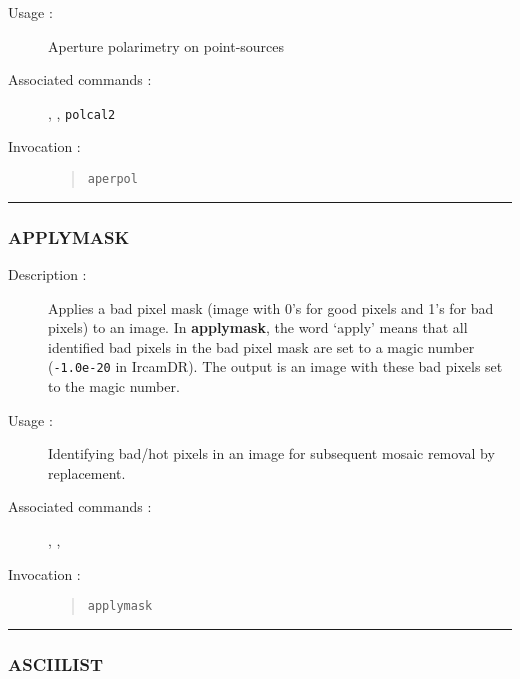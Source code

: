 \begin{description}
\item[Usage :] Aperture polarimetry on point-sources

\item[Associated commands :] {\tt {}},
{\tt {}}, {\tt {}}
{\tt polcal2}

\item[Invocation :]

\begin{quote}{\tt  aperpol }\end{quote}

\end{description}

\hrule
\subsubsection*{\label{APPLYMASK}APPLYMASK}

\begin{description}

\item[Description :] Applies a bad pixel mask (image with 0's for good
pixels and 1's for bad pixels) to an image.  In {\bf applymask}, the word
`apply' means that all identified bad pixels in the bad pixel mask are
set to a magic number ({\tt -1.0e-20} in {\sc IrcamDR}).  The output is
an image with these bad pixels set to the magic number.

\item[Usage :] Identifying bad/hot pixels in an image for subsequent mosaic
removal by replacement.

\item[Associated commands :] {\tt {}},
{\tt {}}, {\tt {}}

\item[Invocation :]

\begin{quote}{\tt  applymask }\end{quote}

\end{description}

\hrule
\subsubsection*{\label{ASCIILIST}ASCIILIST}

